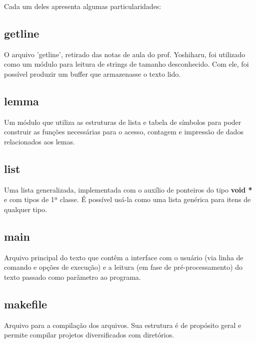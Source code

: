 \documentclass[a4paper,12pt]{article}
\begin{document}
    Cada um deles apresenta algumas particularidades:
    
    \subsection{getline}
        
        O arquivo 'getline', retirado das notas de aula do prof.
        Yoshiharu, foi utilizado como um módulo para leitura de strings
        de tamanho desconhecido. Com ele, foi possível produzir um
        buffer que armazenasse o texto lido.

    \subsection{lemma} 

        Um módulo que utiliza as estruturas de lista e tabela de
        símbolos para poder construir as funções necessárias para o
        acesso, contagem e impressão de dados relacionados aos lemas.

    \subsection{list} 
        Uma lista generalizada, implementada com o auxílio de ponteiros
        do tipo \textbf{void *} e com tipos de 1ª classe. É possível
        usá-la como uma lista genérica para itens de qualquer tipo.

    \subsection{main} 
        Arquivo principal do texto que contêm a interface com o usuário
        (via linha de comando e opções de execução) e a leitura (em fase
        de pré-processamento) do texto passado como parâmetro ao
        programa.

    \subsection{makefile} 
        Arquivo para a compilação dos arquivos. Sua estrutura é de
        propósito geral e permite compilar projetos diversificados com
        diretórios.
        
\end{document}
